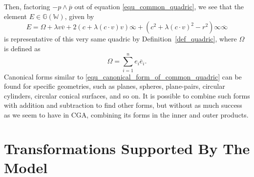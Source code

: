 \documentclass{birkjour}
\theoremstyle{definition}
\theoremstyle{remark}
\numberwithin{equation}{section}
\newcommand{\G}{\mathbb{G}}
\newcommand{\W}{\mathbb{W}}
\newcommand{\nvai}{\infty}
\newcommand{\nvaib}{\overline{\infty}}
\begin{document}
Then, factoring $-p\wedge\overline{p}$ out of equation \eqref{equ_common_quadric}, we see that
the element $E\in\G(\W)$, given by
\begin{equation}\label{equ_canonical_form_of_common_quadric}
E=\Omega + \lambda v\overline{v}+2(c+\lambda(c\cdot v)v)\nvaib+
(c^2+\lambda (c\cdot v)^2-r^2)\nvai\nvaib
\end{equation}
is representative of this very same quadric by Definition~\ref{def_quadric},
where $\Omega$ is defined as
\begin{equation}
\Omega = \sum_{i=1}^n e_i\overline{e}_i.
\end{equation}
Canonical forms similar to \eqref{equ_canonical_form_of_common_quadric}
can be found for specific geometries, such as planes, spheres, plane-pairs,
circular cylinders, circular conical surfaces, and so on.  It is possible to combine
such forms with addition and subtraction to find other forms, but without as much success as we
seem to have in CGA, combining its forms in the inner and outer products.

\section{Transformations Supported By The Model}
\end{document}
